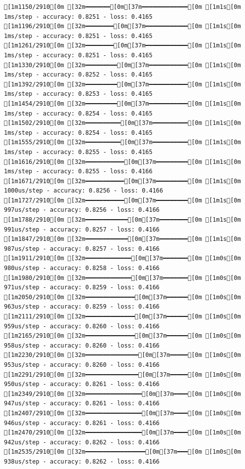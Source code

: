 \documentclass[
  letterpaper,
  DIV=11,
  numbers=noendperiod]{scrartcl}
\begin{document}
\begin{verbatim}
[1m1150/2910[0m [32m━━━━━━━[0m[37m━━━━━━━━━━━━━[0m [1m1s[0m 1ms/step - accuracy: 0.8251 - loss: 0.4165
[1m1196/2910[0m [32m━━━━━━━━[0m[37m━━━━━━━━━━━━[0m [1m1s[0m 1ms/step - accuracy: 0.8251 - loss: 0.4165
[1m1261/2910[0m [32m━━━━━━━━[0m[37m━━━━━━━━━━━━[0m [1m1s[0m 1ms/step - accuracy: 0.8251 - loss: 0.4165
[1m1330/2910[0m [32m━━━━━━━━━[0m[37m━━━━━━━━━━━[0m [1m1s[0m 1ms/step - accuracy: 0.8252 - loss: 0.4165
[1m1392/2910[0m [32m━━━━━━━━━[0m[37m━━━━━━━━━━━[0m [1m1s[0m 1ms/step - accuracy: 0.8253 - loss: 0.4165
[1m1454/2910[0m [32m━━━━━━━━━[0m[37m━━━━━━━━━━━[0m [1m1s[0m 1ms/step - accuracy: 0.8254 - loss: 0.4165
[1m1502/2910[0m [32m━━━━━━━━━━[0m[37m━━━━━━━━━━[0m [1m1s[0m 1ms/step - accuracy: 0.8254 - loss: 0.4165
[1m1555/2910[0m [32m━━━━━━━━━━[0m[37m━━━━━━━━━━[0m [1m1s[0m 1ms/step - accuracy: 0.8255 - loss: 0.4165
[1m1616/2910[0m [32m━━━━━━━━━━━[0m[37m━━━━━━━━━[0m [1m1s[0m 1ms/step - accuracy: 0.8255 - loss: 0.4166
[1m1671/2910[0m [32m━━━━━━━━━━━[0m[37m━━━━━━━━━[0m [1m1s[0m 1000us/step - accuracy: 0.8256 - loss: 0.4166
[1m1727/2910[0m [32m━━━━━━━━━━━[0m[37m━━━━━━━━━[0m [1m1s[0m 997us/step - accuracy: 0.8256 - loss: 0.4166 
[1m1788/2910[0m [32m━━━━━━━━━━━━[0m[37m━━━━━━━━[0m [1m1s[0m 991us/step - accuracy: 0.8257 - loss: 0.4166
[1m1847/2910[0m [32m━━━━━━━━━━━━[0m[37m━━━━━━━━[0m [1m1s[0m 987us/step - accuracy: 0.8257 - loss: 0.4166
[1m1911/2910[0m [32m━━━━━━━━━━━━━[0m[37m━━━━━━━[0m [1m0s[0m 980us/step - accuracy: 0.8258 - loss: 0.4166
[1m1980/2910[0m [32m━━━━━━━━━━━━━[0m[37m━━━━━━━[0m [1m0s[0m 971us/step - accuracy: 0.8259 - loss: 0.4166
[1m2050/2910[0m [32m━━━━━━━━━━━━━━[0m[37m━━━━━━[0m [1m0s[0m 963us/step - accuracy: 0.8259 - loss: 0.4166
[1m2111/2910[0m [32m━━━━━━━━━━━━━━[0m[37m━━━━━━[0m [1m0s[0m 959us/step - accuracy: 0.8260 - loss: 0.4166
[1m2165/2910[0m [32m━━━━━━━━━━━━━━[0m[37m━━━━━━[0m [1m0s[0m 958us/step - accuracy: 0.8260 - loss: 0.4166
[1m2230/2910[0m [32m━━━━━━━━━━━━━━━[0m[37m━━━━━[0m [1m0s[0m 953us/step - accuracy: 0.8260 - loss: 0.4166
[1m2291/2910[0m [32m━━━━━━━━━━━━━━━[0m[37m━━━━━[0m [1m0s[0m 950us/step - accuracy: 0.8261 - loss: 0.4166
[1m2349/2910[0m [32m━━━━━━━━━━━━━━━━[0m[37m━━━━[0m [1m0s[0m 947us/step - accuracy: 0.8261 - loss: 0.4166
[1m2407/2910[0m [32m━━━━━━━━━━━━━━━━[0m[37m━━━━[0m [1m0s[0m 946us/step - accuracy: 0.8261 - loss: 0.4166
[1m2470/2910[0m [32m━━━━━━━━━━━━━━━━[0m[37m━━━━[0m [1m0s[0m 942us/step - accuracy: 0.8262 - loss: 0.4166
[1m2535/2910[0m [32m━━━━━━━━━━━━━━━━━[0m[37m━━━[0m [1m0s[0m 938us/step - accuracy: 0.8262 - loss: 0.4166

\end{verbatim}
\end{document}

